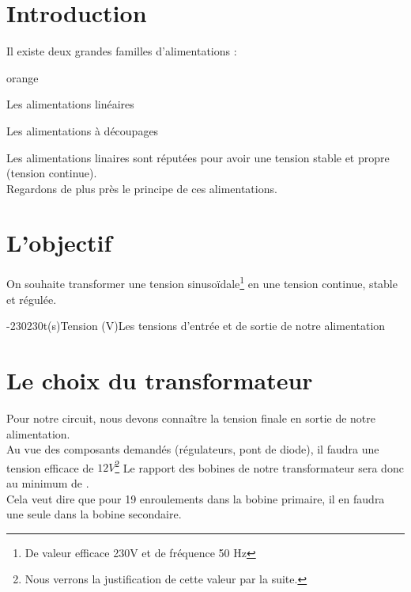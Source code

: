  

\section{Introduction}


Il existe deux grandes familles d'alimentations : 

\begin{items}{orange}{\Triangle}
    \item Les alimentations linéaires
    \item Les alimentations à découpages
\end{items}

Les alimentations linaires sont réputées pour avoir une tension stable et propre (tension continue).\\
Regardons de plus près le principe de ces alimentations.

\section{L'objectif}

On souhaite transformer une tension sinusoïdale\footnote{De valeur efficace 230V et de fréquence 50 Hz} en une tension continue, stable et régulée.

\vfill
\begin{graphicFigure}{0.8}{1}{0}{0.08}{-230}{230}{t(s)}{Tension (V)}{Les tensions d'entrée et de sortie de notre alimentation}
  \end{graphicFigure}

  \newpage
  \section{Le choix du transformateur}

  Pour notre circuit, nous devons connaître la tension finale en sortie de notre alimentation.\\
  Au vue des composants demandés (régulateurs, pont de diode), il faudra une tension efficace de $12V$\footnote{Nous verrons la justification de cette valeur par la suite.}
  Le rapport des bobines de notre transformateur sera donc au minimum de . \\Cela veut dire que pour 19 enroulements dans la bobine primaire, il en faudra une seule dans la bobine secondaire.

